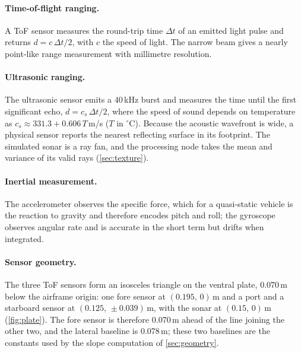 \documentclass[11pt,a4paper]{article}
\begin{document}
\paragraph{Time-of-flight ranging.} A ToF sensor measures the round-trip time $\Delta t$ of an emitted light pulse and returns $d=c\,\Delta t/2$, with $c$ the speed of light. The narrow beam gives a nearly point-like range measurement with millimetre resolution.
 
\paragraph{Ultrasonic ranging.} The ultrasonic sensor emits a 40\,kHz burst and measures the time until the first significant echo, $d=c_s\,\Delta t/2$, where the speed of sound depends on temperature as $c_s\approx331.3+0.606\,T$\,m/s ($T$ in $^\circ$C). Because the acoustic wavefront is wide, a physical sensor reports the nearest reflecting surface in its footprint. The simulated sonar is a ray fan, and the processing node takes the mean and variance of its valid rays (\cref{sec:texture}).
 
\paragraph{Inertial measurement.} The accelerometer observes the specific force, which for a quasi-static vehicle is the reaction to gravity and therefore encodes pitch and roll; the gyroscope observes angular rate and is accurate in the short term but drifts when integrated.
 
\paragraph{Sensor geometry.} The three ToF sensors form an isosceles triangle on the ventral plate, 0.070\,m below the airframe origin: one fore sensor at $(0.195,\,0)$\,m and a port and a starboard sensor at $(0.125,\,\pm0.039)$\,m, with the sonar at $(0.15,\,0)$\,m (\cref{fig:plate}). The fore sensor is therefore 0.070\,m ahead of the line joining the other two, and the lateral baseline is 0.078\,m; these two baselines are the constants used by the slope computation of \cref{sec:geometry}.
 
\end{document}
